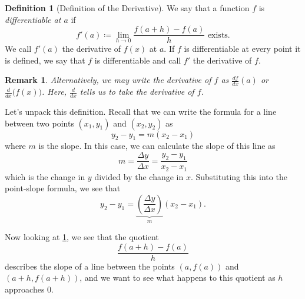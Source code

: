 \documentclass[12pt]{article}
\newcommand{\diff}[2]{\frac{d #1}{d #2} }
\theoremstyle{definition}
\newtheorem{defn}[thm]{Definition}
\theoremstyle{plain}
\newtheorem{rem}[thm]{Remark}
\numberwithin{equation}{section}
\begin{document}




\begin{defn}[Definition of the Derivative]\label{DifDef}
	We say that a function $f$ is \emph{differentiable at $a$} if
	\begin{equation}
		f'(a)\coloneqq\lim\limits_{h\to 0}\frac{f(a+h)-f(a)}{h} \text{ exists}.
	\end{equation}
	We call $f'(a)$ the derivative of $f(x)$ at $a$. If $f$ is differentiable at every point it is defined, we say that $f$ is differentiable and call $f'$ the derivative of $f$.
\end{defn}
\begin{rem}
Alternatively, we may write the derivative of $f$ as $\diff{f}{x}(a)$ or $\diff{}{x}\Big(f(x)\Big)$. Here, $\diff{}{x}$ tells us to take the derivative of $f$.
\end{rem}
Let's unpack this definition. Recall that we can write the formula for a line between two points $(x_1, y_1)$ and $(x_2, y_2)$ as
\[
y_2 - y_1 = m(x_2-x_1)
\]
where $m$ is the slope. In this case, we can calculate the slope of this line as
\[
m = \frac{\Delta y}{\Delta x} = \frac{y_2 - y_1}{x_2 - x_1}
\]
which is the change in $y$ divided by the change in $x$. Substituting this into the point-slope formula, we see that
\[
y_2-y_1 = \underbrace{ \left( \frac{\Delta y}{\Delta x} \right) }_{m}(x_2-x_1).
\]

Now looking at \cref{DifDef}, we see that the quotient
\[
\frac{f(a+h)-f(a)}{h}
\] describes the slope of a line between the points $(a, f(a))$ and $(a+h, f(a+h))$, and we want to see what happens to this quotient as $h$ approaches 0.
\end{document}
